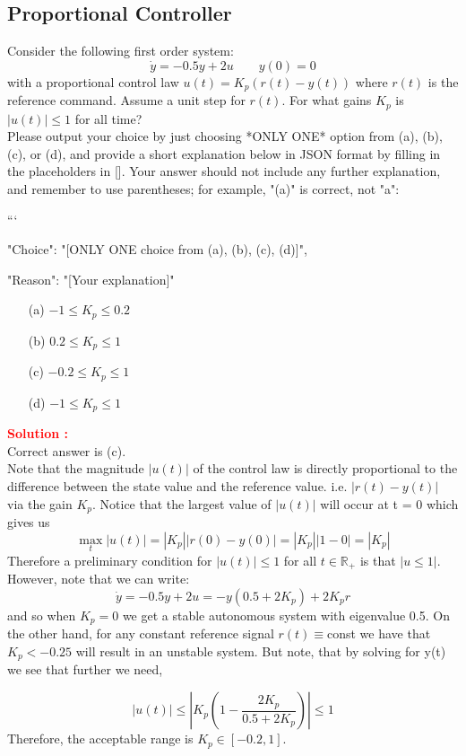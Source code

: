 \documentclass[12pt]{article}
\begin{document}
\subsection{Proportional Controller}

Consider the following first order system:
\[
\dot{y} = -0.5y + 2u \qquad  y(0) = 0
\]
with a proportional control law $u(t) = K_p(r(t) - y(t))$ where $r(t)$ is the reference command. Assume a unit step for $r(t)$. For what gains $K_p$ is $|u(t)| \leq 1$ for all time?\\
 Please output your choice by just choosing *ONLY ONE* option from (a), (b), (c), or (d), and provide a short explanation below in JSON format by filling in the placeholders in []. Your answer should not include any further explanation, and remember to use parentheses; for example, "(a)" is correct, not "a":

```
{

"Choice": "[ONLY ONE choice from (a), (b), (c), (d)]",

"Reason": "[Your explanation]"

}

\begin{itemize}
    \item[(a)] \(-1 \leq K_p \leq 0.2\)
    \item[(b)] \(0.2 \leq K_p \leq 1\)
    \item[(c)] \(-0.2 \leq K_p \leq 1\)
    \item[(d)] \(-1 \leq K_p \leq 1\)
\end{itemize}
\textbf{\textcolor{red}{Solution :}} \\
Correct answer is (c).\\
Note that the magnitude $|u (t)|$ of the control law is directly proportional to the difference
between the state value and the reference value. i.e. $|r(t) - y(t)|$ via the gain $K_p$. Notice that the largest value of $|u(t)|$ will occur at t = 0 which gives us
\[
\max_t |u(t)| =|K_p||r(0)-y(0)|=|K_p||1-0|=|K_p|
\]
Therefore a preliminary condition for $|u(t)| \leq 1$ for all $t \in \mathbb{R}_+$ is that $|u\leq 1|$. However, note that we can write:
\[
\dot{y}=-0.5y +2 u= -y (0.5 + 2K_p) + 2K_p r
\]
and so when $K_p = 0$ we get a stable autonomous system with eigenvalue 0.5. On the
other hand, for any constant reference signal $r(t) \equiv$const we have that $K_p < -0.25$ will result in an unstable system. But note, that by solving for y(t) we see that further we
need,

$$|u (t)| \leq \left| K_p \left( 1- \frac{2 K_p}{0.5 + 2 K_p}\right) \right|\leq 1$$
Therefore, the acceptable range is $K_p \in [-0.2, 1]$.
\clearpage
\end{document}
